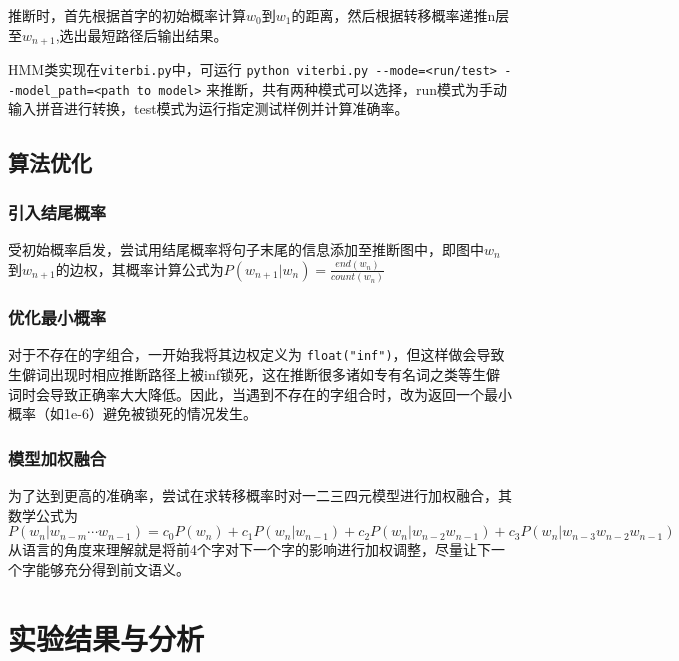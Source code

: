 \documentclass{article}
\begin{document}
\begin{spacing}{1.1}
	\hspace{1.4em}
	
	推断时，首先根据首字的初始概率计算$w_0$到$w_1$的距离，然后根据转移概率递推n层至$w_{n+1}$,选出最短路径后输出结果。
	
	HMM类实现在\verb|viterbi.py|中，可运行 \verb|python viterbi.py --mode=<run/test> --model_path=<path to model>| 来推断，共有两种模式可以选择，run模式为手动输入拼音进行转换，test模式为运行指定测试样例并计算准确率。
	
	\subsection{算法优化}
	\subsubsection{引入结尾概率}
	\hspace{1.4em}
	受初始概率启发，尝试用结尾概率将句子末尾的信息添加至推断图中，即图中$w_n$到$w_{n+1}$的边权，其概率计算公式为$P(w_{n+1}|w_n) = \frac{end(w_n)}{count(w_n)}$
	\subsubsection{优化最小概率}
	\hspace{1.4em}
	对于不存在的字组合，一开始我将其边权定义为 \verb|float("inf")|，但这样做会导致生僻词出现时相应推断路径上被inf锁死，这在推断很多诸如专有名词之类等生僻词时会导致正确率大大降低。因此，当遇到不存在的字组合时，改为返回一个最小概率（如1e-6）避免被锁死的情况发生。
	\subsubsection{模型加权融合}
	\hspace{1.4em}
	为了达到更高的准确率，尝试在求转移概率时对一二三四元模型进行加权融合，其数学公式为$$P(w_n|w_{n-m}\cdots w_{n-1}) = c_0P(w_n)+c_1P(w_n|w_{n-1}) +  c_2P(w_n|w_{n-2}w_{n-1})+c_3P(w_n|w_{n-3}w_{n-2}w_{n-1})$$
	\hspace{1.4em}
	从语言的角度来理解就是将前4个字对下一个字的影响进行加权调整，尽量让下一个字能够充分得到前文语义。

\section{实验结果与分析}

\end{spacing}
\end{document}
